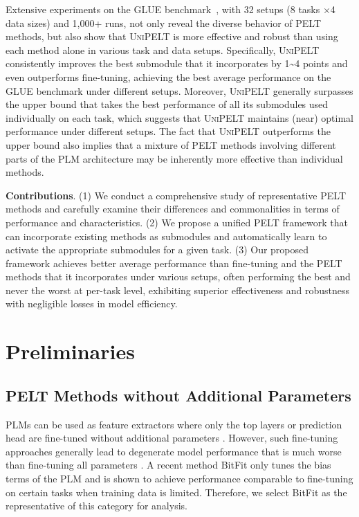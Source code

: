 Extensive experiments on the GLUE benchmark~\cite{wang2019glue}, with 32 setups (8 tasks $\times$4 data sizes) and 1,000+ runs, not only reveal the diverse behavior of PELT methods, but also show that \textsc{UniPELT} is more effective and robust than using each method alone in various task and data setups. Specifically, \textsc{UniPELT} consistently improves the best submodule that it incorporates by 1\textasciitilde4 points and even outperforms fine-tuning, achieving the best average performance on the GLUE benchmark under different setups. Moreover, \textsc{UniPELT} generally surpasses the upper bound that takes the best performance of all its submodules used individually on each task, which suggests that \textsc{UniPELT} maintains (near) optimal performance under different setups. The fact that \textsc{UniPELT} outperforms the upper bound also implies that a mixture of PELT methods involving different parts of the PLM architecture may be inherently more effective than individual methods.

{{\bf Contributions}.} (1) We conduct a comprehensive study of representative PELT methods and carefully examine their differences and commonalities in terms of performance and characteristics. (2) We propose a unified PELT framework that can incorporate existing methods as submodules and automatically learn to activate the appropriate submodules for a given task. (3) Our proposed framework achieves better average performance than fine-tuning and the PELT methods that it incorporates under various setups, often performing the best and never the worst at per-task level, exhibiting superior effectiveness and robustness with negligible losses in model efficiency.

\section{Preliminaries}
\label{sec_prelim}

\subsection{PELT Methods without Additional Parameters} PLMs can be used as feature extractors where only the top layers or prediction head are fine-tuned without additional parameters \cite{lee2019would}. However, such fine-tuning approaches generally lead to degenerate model performance that is much worse than fine-tuning all parameters \cite{lee2019would,pfeiffer-etal-2021-adapterfusion}. A recent method BitFit \cite{ben2021bitfit} only tunes the bias terms of the PLM and is shown to achieve performance comparable to fine-tuning on certain tasks when training data is limited. Therefore, we select BitFit as the representative of this category for analysis.

